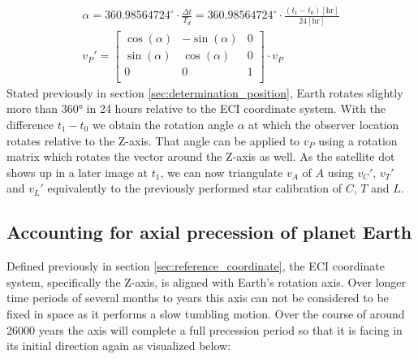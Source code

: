 \documentclass[11pt,a4paper]{article}
\begin{document}
	\begin{equation}
		\label{vector_rotation}
		\begin{aligned}
			\alpha=360.98564724^\circ\cdot \frac{\varDelta t}{T_d}=360.98564724^\circ\cdot \frac{(t_1-t_0)[\mathrm{hr}]}{24[\mathrm{hr}]} \\
			v_P'=
			\begin{bmatrix}
				\cos(\alpha) & -\sin(\alpha) & 0 \\
				\sin(\alpha) & \cos(\alpha) & 0 \\
				0 & 0 & 1 \\
			\end{bmatrix}
			\cdot v_P
		\end{aligned}
	\end{equation}
	Stated previously in section \ref{sec:determination_position}, Earth rotates slightly more than 360° in 24 hours relative to the ECI coordinate system. With the difference $t_1-t_0$ we obtain the rotation angle $\alpha$ at which the observer location rotates relative to the Z-axis. That angle can be applied to $v_P$ using a rotation matrix which rotates the vector around the Z-axis as well.\newline
	As the satellite dot shows up in a later image at $t_1$, we can now triangulate $v_A$ of $A$ using $v_C'$, $v_T'$ and $v_L'$ equivalently to the previously performed star calibration of $C$, $T$ and $L$.
	
	
	\subsection{Accounting for axial precession of planet Earth}
	\label{sec:earth_axis_precession}
	Defined previously in section \ref{sec:reference_coordinate}, the ECI coordinate system, specifically the Z-axis, is aligned with Earth's rotation axis. Over longer time periods of several months to years this axis can not be considered to be fixed in space as it performs a slow tumbling motion. Over the course of around 26000 years the axis will complete a full precession period so that it is facing in its initial direction again \cite{precession_definition} as visualized below:
	
\end{document}

